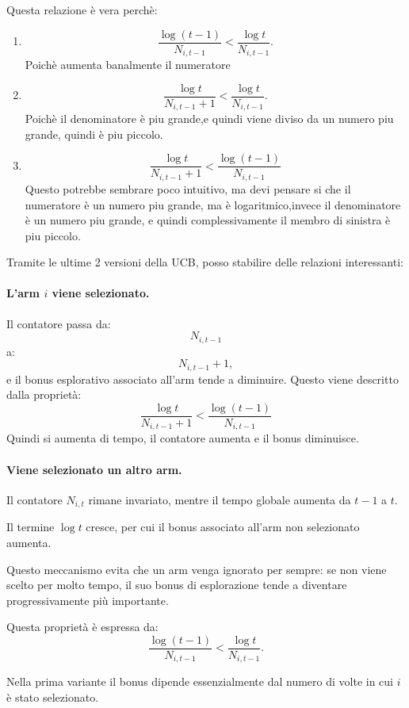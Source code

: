 Questa relazione è vera perchè:
\begin{enumerate}
    \item 
    \[
    \frac{\log(t-1)}{N_{i,t-1}}
    <
    \frac{\log t}{N_{i,t-1}}.
    \]
    Poichè aumenta banalmente il numeratore
    \item 
    \[
    \frac{\log t}{N_{i,t-1}+1}
    <
    \frac{\log t}{N_{i,t-1}}.
    \]
    Poichè il denominatore è piu grande,e quindi viene diviso da un numero piu grande, quindi è piu piccolo.
    \item
    \[
    \frac{\log t}{N_{i,t-1}+1}
    <
    \frac{\log(t-1)}{N_{i,t-1}}
    \]
    Questo potrebbe sembrare poco intuitivo, ma devi pensare si che il numeratore è un numero piu grande, ma è logaritmico,invece il denominatore è un numero piu grande, e quindi complessivamente il membro di sinistra è piu piccolo.
\end{enumerate}


Tramite le ultime 2 versioni della UCB, posso stabilire delle relazioni interessanti:

\paragraph{L'arm $i$ viene selezionato.}
Il contatore passa da:
\[
N_{i,t-1}
\]
a:
\[
N_{i,t-1}+1,
\]
e il bonus esplorativo associato all'arm tende a diminuire.
Questo viene descritto dalla proprietà:
\[
    \frac{\log t}{N_{i,t-1}+1}
    <
    \frac{\log(t-1)}{N_{i,t-1}}
\]
Quindi si aumenta di tempo, il contatore aumenta e il bonus diminuisce.

\paragraph{Viene selezionato un altro arm.}
Il contatore $N_{i,t}$ rimane invariato, mentre il tempo globale aumenta da $t-1$ a $t$.

Il termine $\log t$ cresce, per cui il bonus associato all'arm non selezionato aumenta.

Questo meccanismo evita che un arm venga ignorato per sempre: se non viene scelto per molto tempo, il suo bonus di esplorazione tende a diventare progressivamente più importante.

Questa proprietà è espressa da:
\[
\frac{\log(t-1)}{N_{i,t-1}}
<
\frac{\log t}{N_{i,t-1}}.
\]

Nella prima variante il bonus dipende essenzialmente dal numero di volte in cui $i$ è stato selezionato.

